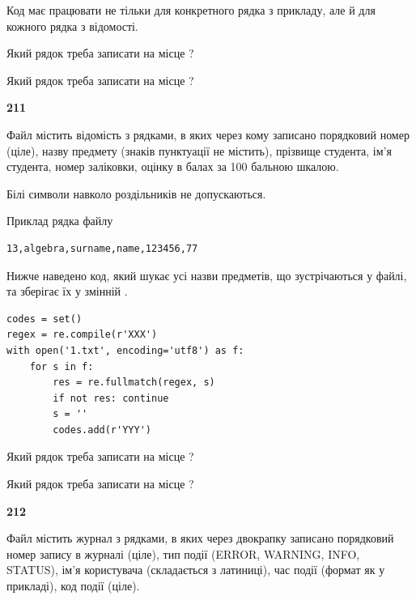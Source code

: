 Код має працювати не тільки для конкретного рядка з прикладу, але й для кожного рядка з відомості.




Який рядок треба записати на місце  ?\par
\vspace{5mm}


Який рядок треба записати на місце  ?\par


\newpage

{\begin {center}\textbf{ 211}\end {center}}\par
Файл  містить відомість з рядками, в яких через кому записано поряд\-ковий номер (ціле), назву предмету (знаків пунктуації не містить), прізвище студента, ім'я студента, номер заліковки, оцінку в балах за 100 бальною шкалою.

Білі символи навколо роздільників не допускаються.

Приклад рядка файлу



\begin{verbatim}
13,algebra,surname,name,123456,77
\end{verbatim}


Нижче наведено код, який шукає усі назви предметів, що зустрічаються у файлі, та зберігає їх у змінній .



\begin{verbatim}
codes = set()
regex = re.compile(r'XXX')
with open('1.txt', encoding='utf8') as f:
    for s in f:
        res = re.fullmatch(regex, s)
        if not res: continue
        s = ''
        codes.add(r'YYY')
\end{verbatim}





Який рядок треба записати на місце  ?\par
\vspace{5mm}


Який рядок треба записати на місце  ?\par


\newpage

{\begin {center}\textbf{ 212}\end {center}}\par
Файл  містить журнал з рядками, в яких через двокрапку записано поряд\-ко\-вий номер запису в журналі (ціле), тип події (ERROR, WARNING, INFO, STATUS), ім'я користувача (складається з латиниці), час події (фор\-мат як у прикладі), код події (ціле).

